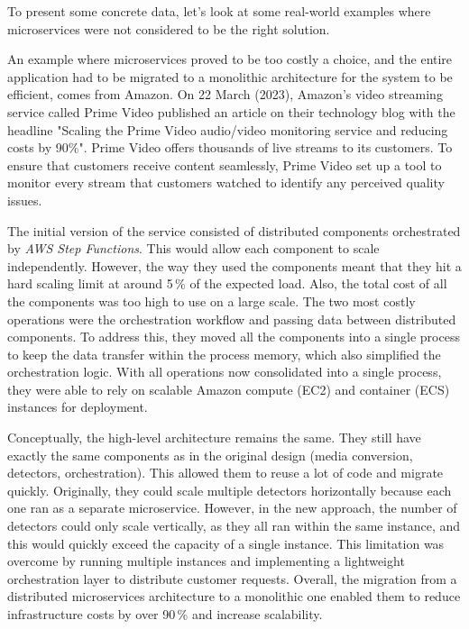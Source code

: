 To present some concrete data, let's look at some real-world examples where microservices were not considered to be the right solution.

\begin{example}
    An example where microservices proved to be too costly a choice, and the entire application had to be migrated to a monolithic architecture for the system to be efficient, comes from Amazon. On 22 March (2023), Amazon's video streaming service called Prime Video published an article on their technology blog with the headline "Scaling the Prime Video audio/video monitoring service and reducing costs by 90\%". Prime Video offers thousands of live streams to its customers. To ensure that customers receive content seamlessly, Prime Video set up a tool to monitor every stream that customers watched to identify any perceived quality issues. \cite{AMAZON_ARTICLE}

    The initial version of the service consisted of distributed components orchestrated by \textit{AWS Step Functions}. This would allow each component to scale independently. However, the way they used the components meant that they hit a hard scaling limit at around 5\,\% of the expected load. Also, the total cost of all the components was too high to use on a large scale. The two most costly operations were the orchestration workflow and passing data between distributed components. To address this, they moved all the components into a single process to keep the data transfer within the process memory, which also simplified the orchestration logic. With all operations now consolidated into a single process, they were able to rely on scalable Amazon compute (EC2) and container (ECS) instances for deployment. \cite{AMAZON_ARTICLE}

    Conceptually, the high-level architecture remains the same. They still have exactly the same components as in the original design (media conversion, detectors, orchestration). This allowed them to reuse a lot of code and migrate quickly. Originally, they could scale multiple detectors horizontally because each one ran as a separate microservice. However, in the new approach, the number of detectors could only scale vertically, as they all ran within the same instance, and this would quickly exceed the capacity of a single instance. This limitation was overcome by running multiple instances and implementing a lightweight orchestration layer to distribute customer requests. Overall, the migration from a distributed microservices architecture to a monolithic one enabled them to reduce infrastructure costs by over 90\,\% and increase scalability. \cite{AMAZON_ARTICLE}
\end{example}

